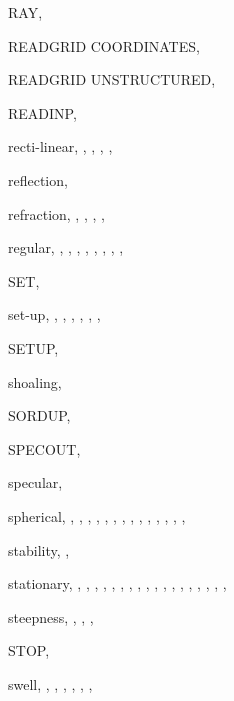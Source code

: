 \documentclass[12pt]{book}
\begin{document}
\begin{theindex}
  \indexspace

  \item RAY, 
  \item READGRID COORDINATES, 
  \item READGRID UNSTRUCTURED, 
  \item READINP, 
  \item recti-linear, , , , 
		, 
  \item reflection, 
  \item refraction, , , , 
		, 
  \item regular, , , , 
		, , , 
		, , 

  \indexspace

  \item SET, 
  \item set-up, , , , 
		, , , 
  \item SETUP, 
  \item shoaling, 
  \item SORDUP, 
  \item SPECOUT, 
  \item specular, 
  \item spherical, , , , 
		, , , 
		, , , 
		, , , 
		, , 
  \item stability, , 
  \item stationary, , , , 
		, , , 
		, , , 
		, , 
		, , , 
		, , , 
		, 
  \item steepness, , , , 
  \item STOP, 
  \item swell, , , , 
		, , , 


\end{theindex}
\end{document}
